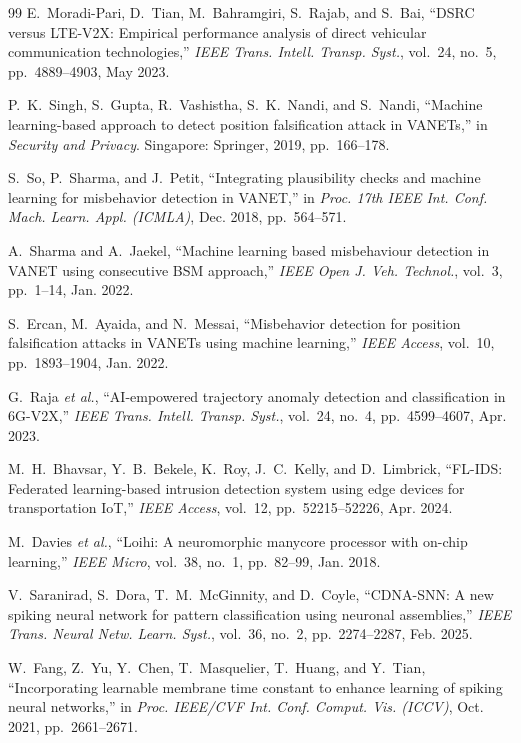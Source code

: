 \documentclass[journal]{IEEEtran}
\begin{document}
\begin{thebibliography}{99}
E.~Moradi-Pari, D.~Tian, M.~Bahramgiri, S.~Rajab, and S.~Bai, ``DSRC versus LTE-V2X: Empirical performance analysis of direct vehicular communication technologies,'' \emph{IEEE Trans. Intell. Transp. Syst.}, vol.~24, no.~5, pp.~4889--4903, May 2023.

P.~K.~Singh, S.~Gupta, R.~Vashistha, S.~K.~Nandi, and S.~Nandi, ``Machine learning-based approach to detect position falsification attack in VANETs,'' in \emph{Security and Privacy}. Singapore: Springer, 2019, pp.~166--178.

S.~So, P.~Sharma, and J.~Petit, ``Integrating plausibility checks and machine learning for misbehavior detection in VANET,'' in \emph{Proc. 17th IEEE Int. Conf. Mach. Learn. Appl. (ICMLA)}, Dec. 2018, pp.~564--571.

A.~Sharma and A.~Jaekel, ``Machine learning based misbehaviour detection in VANET using consecutive BSM approach,'' \emph{IEEE Open J. Veh. Technol.}, vol.~3, pp.~1--14, Jan. 2022.

S.~Ercan, M.~Ayaida, and N.~Messai, ``Misbehavior detection for position falsification attacks in VANETs using machine learning,'' \emph{IEEE Access}, vol.~10, pp.~1893--1904, Jan. 2022.

G.~Raja \emph{et al.}, ``AI-empowered trajectory anomaly detection and classification in 6G-V2X,'' \emph{IEEE Trans. Intell. Transp. Syst.}, vol.~24, no.~4, pp.~4599--4607, Apr. 2023.

M.~H.~Bhavsar, Y.~B.~Bekele, K.~Roy, J.~C.~Kelly, and D.~Limbrick, ``FL-IDS: Federated learning-based intrusion detection system using edge devices for transportation IoT,'' \emph{IEEE Access}, vol.~12, pp.~52215--52226, Apr. 2024.

M.~Davies \emph{et al.}, ``Loihi: A neuromorphic manycore processor with on-chip learning,'' \emph{IEEE Micro}, vol.~38, no.~1, pp.~82--99, Jan. 2018.

V.~Saranirad, S.~Dora, T.~M.~McGinnity, and D.~Coyle, ``{CDNA-SNN}: A new spiking neural network for pattern classification using neuronal assemblies,'' \emph{IEEE Trans. Neural Netw. Learn. Syst.}, vol.~36, no.~2, pp.~2274--2287, Feb. 2025.

W.~Fang, Z.~Yu, Y.~Chen, T.~Masquelier, T.~Huang, and Y.~Tian, ``Incorporating learnable membrane time constant to enhance learning of spiking neural networks,'' in \emph{Proc. IEEE/CVF Int. Conf. Comput. Vis. (ICCV)}, Oct. 2021, pp.~2661--2671.


\end{thebibliography}
\end{document}
